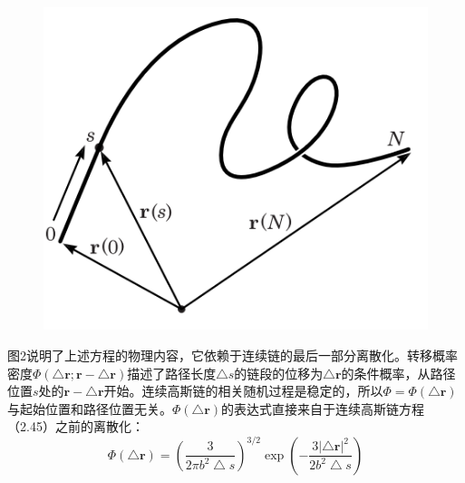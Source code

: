 \documentclass[12pt,a4paper]{article}
\begin{document}
\begin{figure}[H]
\centering
\includegraphics[scale=0.7]{./figures/1.png}
\caption{}
\end{figure}

图2说明了上述方程的物理内容，它依赖于连续链的最后一部分离散化。转移概率密度$\Phi(\bigtriangleup \mathbf{r};\mathbf{r}-\bigtriangleup \mathbf{r})$描述了路径长度$\bigtriangleup s$的链段的位移为$\bigtriangleup \mathbf{r}$的条件概率，从路径位置$s$处的$\mathbf{r}-\bigtriangleup \mathbf{r}$开始。连续高斯链的相关随机过程是稳定的，所以$\Phi =\Phi(\bigtriangleup \mathbf{r})$与起始位置和路径位置无关。$\Phi(\bigtriangleup \mathbf{r})$的表达式直接来自于连续高斯链方程（2.45）之前的离散化：
$$\Phi(\bigtriangleup \mathbf{r})=\left( \frac{3}{2\pi b^2 \bigtriangleup s} \right)^{3/2}\exp \left(- \frac{3\left| \bigtriangleup \mathbf{r} \right|^2}{2b^2 \bigtriangleup s} \right)$$
\end{document}
